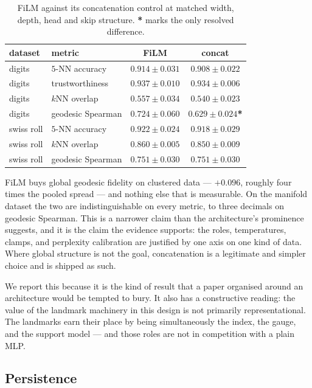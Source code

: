 \documentclass[12pt]{iopart}
\theoremstyle{definition}
\theoremstyle{plain}
\theoremstyle{remark}
\begin{document}
\begin{table}[htbp]
\centering
\small
\caption{FiLM against its concatenation control at matched width, depth, head
and skip structure. \textbf{*} marks the only resolved difference.}
\label{tab:film}
\begin{tabular}{llcc}
\toprule
dataset & metric & FiLM & concat \\
\midrule
digits & $5$-NN accuracy      & $0.914\pm0.031$ & $0.908\pm0.022$ \\
digits & trustworthiness      & $0.937\pm0.010$ & $0.934\pm0.006$ \\
digits & $k$NN overlap        & $0.557\pm0.034$ & $0.540\pm0.023$ \\
digits & geodesic Spearman    & $0.724\pm0.060$ & $0.629\pm0.024$\;\textbf{*} \\
swiss roll & $5$-NN accuracy  & $0.922\pm0.024$ & $0.918\pm0.029$ \\
swiss roll & $k$NN overlap    & $0.860\pm0.005$ & $0.850\pm0.009$ \\
swiss roll & geodesic Spearman& $0.751\pm0.030$ & $0.751\pm0.030$ \\
\bottomrule
\end{tabular}
\end{table}

FiLM buys global geodesic fidelity on clustered data --- $+0.096$, roughly four
times the pooled spread --- and nothing else that is measurable. On the manifold
dataset the two are indistinguishable on every metric, to three decimals on
geodesic Spearman. This is a narrower claim than the architecture's prominence
suggests, and it is the claim the evidence supports: the roles, temperatures,
clamps, and perplexity calibration are justified by one axis on one kind of
data. Where global structure is not the goal, concatenation is a legitimate and
simpler choice and is shipped as such.

We report this because it is the kind of result that a paper organised around
an architecture would be tempted to bury. It also has a constructive reading:
the value of the landmark machinery in this design is not primarily
representational. The landmarks earn their place by being simultaneously the
index, the gauge, and the support model --- and those roles are not in
competition with a plain MLP.

\subsection{Persistence}
\label{sec:persistenceresults}
\end{document}
